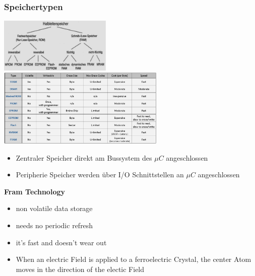 \begin{minipage}{\linewidth}
    \subsubsection{Speichertypen}\vspace{-1.5cm}
    \includegraphics[width=0.4\textwidth]{images/SystembusSpeicherSpeichersystem/SpeicherSysHalbLeit}
    \includegraphics[width=0.6\textwidth]{images/SystembusSpeicherSpeichersystem/SpeicherSysHalbLeit1}
\end{minipage}\newline
\begin{minipage}{0.5\linewidth}
\begin{itemize}
    \item Zentraler Speicher
    \subitem direkt am Bussystem des $ \mu C $ angeschlossen
    \item Peripherie Speicher
    \subitem werden über I/O Schnittstellen an $ \mu C $ angeschlossen
\end{itemize}

\textbf{Fram Technology}
\begin{itemize}
    \item non volatile data storage
    \item needs no periodic refresh
    \item it's fast and doesn't wear out
    \item When an electric Field is applied to a ferroelectric Crystal, the center Atom moves in the direction of the electic Field
\end{itemize}
\end{minipage}
